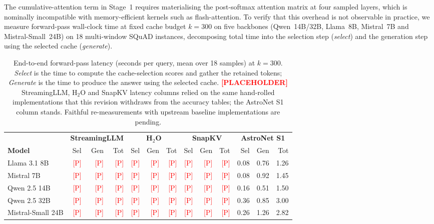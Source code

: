 The cumulative-attention term in Stage~1 requires materialising the
post-softmax attention matrix at four sampled layers, which is
nominally incompatible with memory-efficient kernels such as
flash-attention. To verify that this overhead is not observable in
practice, we measure forward-pass wall-clock time at fixed cache
budget $k{=}300$ on five backbones (Qwen~14B/32B, Llama~8B, Mistral~7B
and Mistral-Small~24B) on 18 multi-window SQuAD instances, decomposing
total time into the selection step (\emph{select}) and the
generation step using the selected cache (\emph{generate}).

\begin{table}[t]
\caption{End-to-end forward-pass latency (seconds per query, mean over 18 samples) at $k{=}300$. \emph{Select} is the time to compute the cache-selection scores and gather the retained tokens; \emph{Generate} is the time to produce the answer using the selected cache. \textcolor{red}{\textbf{[PLACEHOLDER]}} StreamingLLM, H$_2$O and SnapKV latency columns relied on the same hand-rolled implementations that this revision withdraws from the accuracy tables; the AstroNet S1 column stands. Faithful re-measurements with upstream baseline implementations are pending.}
\label{tab:latency}
\centering
\small
\setlength{\tabcolsep}{4pt}
\begin{tabular}{l rrr rrr rrr rrr}
\toprule
& \multicolumn{3}{c}{\textbf{StreamingLLM}} & \multicolumn{3}{c}{\textbf{H${}_2$O}} & \multicolumn{3}{c}{\textbf{SnapKV}} & \multicolumn{3}{c}{\textbf{AstroNet S1}} \\
\cmidrule(lr){2-4}\cmidrule(lr){5-7}\cmidrule(lr){8-10}\cmidrule(lr){11-13}
\textbf{Model} & Sel & Gen & Tot & Sel & Gen & Tot & Sel & Gen & Tot & Sel & Gen & Tot \\
\midrule
Llama 3.1 8B      & \textcolor{red}{[P]}&\textcolor{red}{[P]}&\textcolor{red}{[P]} & \textcolor{red}{[P]}&\textcolor{red}{[P]}&\textcolor{red}{[P]} & \textcolor{red}{[P]}&\textcolor{red}{[P]}&\textcolor{red}{[P]} & 0.08 & 0.76 & 1.26 \\
Mistral 7B        & \textcolor{red}{[P]}&\textcolor{red}{[P]}&\textcolor{red}{[P]} & \textcolor{red}{[P]}&\textcolor{red}{[P]}&\textcolor{red}{[P]} & \textcolor{red}{[P]}&\textcolor{red}{[P]}&\textcolor{red}{[P]} & 0.08 & 0.92 & 1.45 \\
Qwen 2.5 14B      & \textcolor{red}{[P]}&\textcolor{red}{[P]}&\textcolor{red}{[P]} & \textcolor{red}{[P]}&\textcolor{red}{[P]}&\textcolor{red}{[P]} & \textcolor{red}{[P]}&\textcolor{red}{[P]}&\textcolor{red}{[P]} & 0.16 & 0.51 & 1.50 \\
Qwen 2.5 32B      & \textcolor{red}{[P]}&\textcolor{red}{[P]}&\textcolor{red}{[P]} & \textcolor{red}{[P]}&\textcolor{red}{[P]}&\textcolor{red}{[P]} & \textcolor{red}{[P]}&\textcolor{red}{[P]}&\textcolor{red}{[P]} & 0.36 & 0.85 & 3.00 \\
Mistral-Small 24B & \textcolor{red}{[P]}&\textcolor{red}{[P]}&\textcolor{red}{[P]} & \textcolor{red}{[P]}&\textcolor{red}{[P]}&\textcolor{red}{[P]} & \textcolor{red}{[P]}&\textcolor{red}{[P]}&\textcolor{red}{[P]} & 0.26 & 1.26 & 2.82 \\
\bottomrule
\end{tabular}
\end{table}

